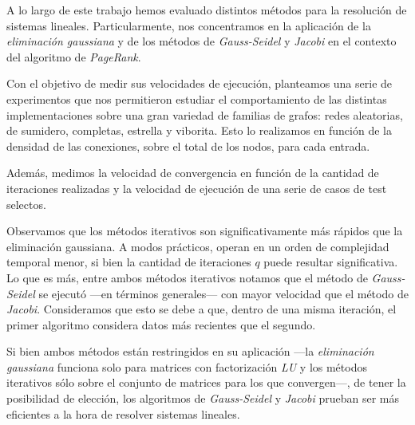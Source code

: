 A lo largo de este trabajo hemos evaluado distintos métodos para la resolución de sistemas lineales. Particularmente, nos concentramos en la aplicación de la \textit{eliminación gaussiana} y de los métodos de \textit{Gauss-Seidel} y \textit{Jacobi} en el contexto del algoritmo de \textit{PageRank}. 

Con el objetivo de medir sus velocidades de ejecución, planteamos una serie de experimentos que nos permitieron estudiar el comportamiento de las distintas implementaciones sobre una gran variedad de familias de grafos: redes aleatorias, de sumidero, completas, estrella y viborita. Esto lo realizamos en función de la densidad de las conexiones, sobre el total de los nodos, para cada entrada.

Además, medimos la velocidad de convergencia en función de la cantidad de iteraciones realizadas y la velocidad de ejecución de una serie de casos de test selectos.

\vspace{1em}
Observamos que los métodos iterativos son significativamente más rápidos que la eliminación gaussiana. A modos prácticos, operan en un orden de complejidad temporal menor, si bien la cantidad de iteraciones $q$ puede resultar significativa. Lo que es más, entre ambos métodos iterativos notamos que el método de \textit{Gauss-Seidel} se ejecutó ---en términos generales--- con mayor velocidad que el método de \textit{Jacobi}. Consideramos que esto se debe a que, dentro de una misma iteración, el primer algoritmo considera datos más recientes que el segundo. 

\vspace{1em}
Si bien ambos métodos están restringidos en su aplicación ---la \textit{eliminación gaussiana} funciona solo para matrices con factorización \textit{LU} y los métodos iterativos sólo sobre el conjunto de matrices para los que convergen---, de tener la posibilidad de elección, los algoritmos de \textit{Gauss-Seidel} y \textit{Jacobi} prueban ser más eficientes a la hora de resolver sistemas lineales.